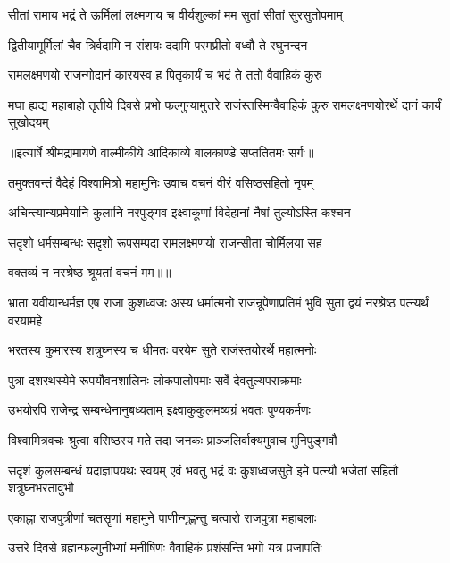 \twolineshloka
{सीतां रामाय भद्रं ते ऊर्मिलां लक्ष्मणाय च}
{वीर्यशुल्कां मम सुतां सीतां सुरसुतोपमाम्} %

\twolineshloka
{द्वितीयामूर्मिलां चैव त्रिर्वदामि न संशयः}
{ददामि परमप्रीतो वध्वौ ते रघुनन्दन} %

\twolineshloka
{रामलक्ष्मणयो राजन्गोदानं कारयस्व ह}
{पितृकार्यं च भद्रं ते ततो वैवाहिकं कुरु} %

\threelineshloka
{मघा ह्यद्य महाबाहो तृतीये दिवसे प्रभो}
{फल्गुन्यामुत्तरे राजंस्तस्मिन्वैवाहिकं कुरु}
{रामलक्ष्मणयोरर्थे दानं कार्यं सुखोदयम्} %


{॥इत्यार्षे श्रीमद्रामायणे वाल्मीकीये आदिकाव्ये बालकाण्डे सप्ततितमः सर्गः॥}


\twolineshloka
{तमुक्तवन्तं वैदेहं विश्वामित्रो महामुनिः}
{उवाच वचनं वीरं वसिष्ठसहितो नृपम्} %

\twolineshloka
{अचिन्त्यान्यप्रमेयानि कुलानि नरपुङ्गव}
{इक्ष्वाकूणां विदेहानां नैषां तुल्योऽस्ति कश्चन} %

\twolineshloka
{सदृशो धर्मसम्बन्धः सदृशो रूपसम्पदा}
{रामलक्ष्मणयो राजन्सीता चोर्मिलया सह} %

{वक्तव्यं न नरश्रेष्ठ श्रूयतां वचनं मम॥॥} %

\addtocounter{shlokacount}{1}

\threelineshloka
{भ्राता यवीयान्धर्मज्ञ एष राजा कुशध्वजः}
{अस्य धर्मात्मनो राजन्रूपेणाप्रतिमं भुवि}
{सुता द्वयं नरश्रेष्ठ पत्न्यर्थं वरयामहे} %

\twolineshloka
{भरतस्य कुमारस्य शत्रुघ्नस्य च धीमतः}
{वरयेम सुते राजंस्तयोरर्थे महात्मनोः} %

\twolineshloka
{पुत्रा दशरथस्येमे रूपयौवनशालिनः}
{लोकपालोपमाः सर्वे देवतुल्यपराक्रमाः} %

\twolineshloka
{उभयोरपि राजेन्द्र सम्बन्धेनानुबध्यताम्}
{इक्ष्वाकुकुलमव्यग्रं भवतः पुण्यकर्मणः} %

\twolineshloka
{विश्वामित्रवचः श्रुत्वा वसिष्ठस्य मते तदा}
{जनकः प्राञ्जलिर्वाक्यमुवाच मुनिपुङ्गवौ} %

\threelineshloka
{सदृशं कुलसम्बन्धं यदाज्ञापयथः स्वयम्}
{एवं भवतु भद्रं वः कुशध्वजसुते इमे}
{पत्न्यौ भजेतां सहितौ शत्रुघ्नभरतावुभौ} %

\twolineshloka
{एकाह्ना राजपुत्रीणां चतसॄणां महामुने}
{पाणीन्गृह्णन्तु चत्वारो राजपुत्रा महाबलाः} %

\twolineshloka
{उत्तरे दिवसे ब्रह्मन्फल्गुनीभ्यां मनीषिणः}
{वैवाहिकं प्रशंसन्ति भगो यत्र प्रजापतिः} %

